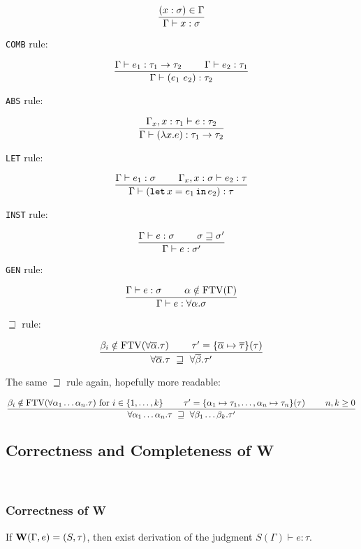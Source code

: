 \documentclass[a4paper,oneside]{memoir}
\begin{document}
$$\dfrac{(x : \sigma) \in \Gamma}{ \Gamma \vdash x : \sigma}$$

\texttt{COMB} rule:

$$\dfrac{\Gamma \vdash e_1 : \tau_1 \rightarrow \tau_2 ~ ~ ~ ~ ~ ~ ~ \Gamma \vdash e_2 : \tau_1}{\Gamma \vdash (e_1~e_2) : \tau_2}$$

\texttt{ABS} rule:

$$\dfrac{\Gamma_x,x:\tau_1 \vdash e : \tau_2}{\Gamma \vdash (\lambda x . e) :  \tau_1 \rightarrow \tau_2}$$

\texttt{LET} rule:

$$\dfrac{\Gamma \vdash e_1 : \sigma ~ ~ ~ ~ ~ ~ ~ \Gamma_x,x:\sigma \vdash e_2 : \tau}{\Gamma \vdash (\texttt{let} \, x = e_1 \, \texttt{in} \, e_2) :  \tau}$$

\texttt{INST} rule:

$$\dfrac{\Gamma \vdash e : \sigma ~ ~ ~ ~ ~ ~ ~ \sigma \sqsupseteq \sigma^\prime}{\Gamma \vdash e : \sigma^\prime}$$

\texttt{GEN} rule:

$$\dfrac{\Gamma \vdash e : \sigma ~ ~ ~ ~ ~ ~ ~ \alpha \notin \operatorname{FTV}(\Gamma)}{\Gamma \vdash e : \forall \alpha . \sigma}$$

$\sqsupseteq$ rule:

$$\dfrac{\beta_i \notin \operatorname{FTV}(\forall \overline{\alpha}.\tau) ~ ~ ~ ~ ~ ~ ~ \tau^\prime = \{\overline{\alpha} \mapsto \overline{\tau}\}(\tau)}{\forall \overline{\alpha}.\tau  ~ \sqsupseteq ~   \forall \overline{\beta}.\tau^\prime}$$

The same $\sqsupseteq$ rule again, hopefully more readable:

$$\dfrac{\beta_i \notin \operatorname{FTV}(\forall \alpha_1\dots\alpha_n.\tau) \text{ for } i \in \{1,\dots,k\} ~ ~ ~ ~ ~ ~ ~ \tau^\prime = \{ \alpha_1 \mapsto \tau_1,  \dots, \alpha_n \mapsto \tau_n \}(\tau) ~ ~ ~ ~ ~ ~ ~ n,k \geq 0}{\forall \alpha_1\dots\alpha_n.\tau  ~ \sqsupseteq ~   \forall \beta_1\dots\beta_k.\tau^\prime}$$



\subsection{Correctness and Completeness of W}

~

\subsubsection{Correctness of W}

If $\operatorname{\textbf{W}}(\Gamma, e) = (S, \tau)$, then exist derivation of the judgment $S(\Gamma) \vdash e : \tau$.
\end{document}
